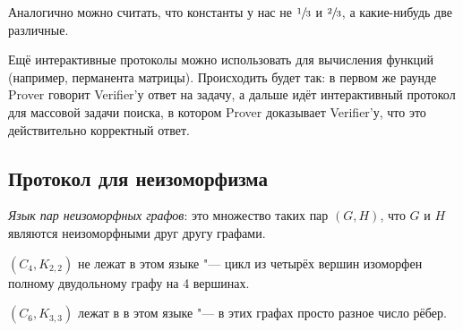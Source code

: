 	\begin{Rem}
		Аналогично можно считать, что константы у нас не $\sfrac13$ и $\sfrac23$, а какие-нибудь две различные.
	\end{Rem}
	\begin{Rem}
		Ещё интерактивные протоколы можно использовать для вычисления функций (например, перманента матрицы).
		Происходить будет так: в первом же раунде Prover говорит Verifier'у ответ на задачу, а дальше идёт интерактивный протокол
		для массовой задачи поиска, в котором Prover доказывает Verifier'у, что это действительно корректный ответ.
	\end{Rem}

\subsection{Протокол для неизоморфизма}
	\begin{Def}
		\textit{Язык пар неизоморфных графов}: это множество таких пар $(G, H)$, что $G$ и $H$ являются неизоморфными друг другу графами.
	\end{Def}
	\begin{exmp}
		$(C_4, K_{2,2})$ не лежат в этом языке "--- цикл из четырёх вершин изоморфен полному двудольному графу на 4 вершинах.
	\end{exmp}
	\begin{exmp}
		$(C_6, K_{3,3})$ лежат в в этом языке "--- в этих графах просто разное число рёбер.
	\end{exmp}

